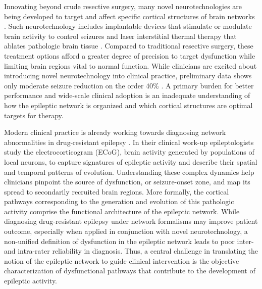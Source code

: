 Innovating beyond crude resective surgery, many novel neurotechnologies are being developed to target and affect specific cortical structures of brain networks \cite{stacey2008technology}. Such neurotechnology includes implantable devices that stimulate or modulate brain activity to control seizures \cite{fisher2010electrical, morrell2011responsive} and laser interstitial thermal therapy that ablates pathologic brain tissue \cite{tovar-spinoza2013use, medvid2015current}. Compared to traditional resective surgery, these treatment options afford a greater degree of precision to target dysfunction while limiting brain regions vital to normal function. While clinicians are excited about introducing novel neurotechnology into clinical practice, preliminary data shows only moderate seizure reduction on the order 40\% \cite{morrell2011responsive}. A primary burden for better performance and wide-scale clinical adoption is an inadequate understanding of how the epileptic network is organized and which cortical structures are optimal targets for therapy.

Modern clinical practice is already working towards diagnosing network abnormalities in drug-resistant epilepsy \cite{spencer2002neural}. In their clinical work-up epileptologists study the electrocorticogram (ECoG), brain activity generated by populations of local neurons, to capture signatures of epileptic activity and describe their spatial and temporal patterns of evolution. Understanding these complex dynamics help clinicians pinpoint the source of dysfunction, or seizure-onset zone, and map its spread to secondarily recruited brain regions. More formally, the cortical pathways corresponding to the generation and evolution of this pathologic activity comprise the functional architecture of the epileptic network. While diagnosing drug-resistant epilepsy under network formalisms may improve patient outcome, especially when applied in conjunction with novel neurotechnology, a non-unified definition of dysfunction in the epileptic network leads to poor inter- and intra-rater reliability in diagnosis. Thus, a central challenge in translating the notion of the epileptic network to guide clinical intervention is the objective characterization of dysfunctional pathways that contribute to the development of epileptic activity.

